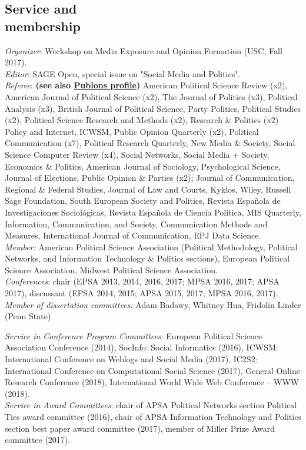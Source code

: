 \documentclass[margin,line,11pt]{resume}
\newcommand{\nl}{\vspace{0.10in}\\}
\begin{document}
\begin{resume}
                \section{\mysidestyle Service and\\membership}
\emph{Organizer}: Workshop on Media Exposure and Opinion Formation (USC, Fall 2017).\nl
\emph{Editor}: SAGE Open, special issue on "Social Media and Politics".\nl
\emph{Referee}: \textbf{(see also \href{https://publons.com/author/1291880/pablo-barbera}{Publons profile})} American Political Science Review (x2), American Journal of Political Science (x2), The Journal of Politics (x3), Political Analysis (x3), British Journal of Political Science, Party Politics, Political Studies (x2), Political Science Research and Methods (x2), Research \& Politics (x2) Policy and Internet, ICWSM, Public Opinion Quarterly (x2), Political Communication (x7), Political Research Quarterly, New Media \& Society, Social Science Computer Review (x4), Social Networks, Social Media + Society, Economics \& Politics, American Journal of Sociology, Psychological Science, Journal of Elections, Public Opinion \& Parties (x2); Journal of Communication, Regional \& Federal Studies, Journal of Law and Courts, Kyklos, Wiley, Russell Sage Foundation, South European Society and Politics, Revista Espa\~{n}ola de Investigaciones Sociol\'{o}gicas, Revista Espa\~{n}ola de Ciencia Pol\'{i}tica, MIS Quarterly, Information, Communication, and Society, Communication Methods and Measures, International Journal of Communication, EPJ Data Science.\nl
\emph{Member:} American Political Science Association (Political Methodology, Political Networks, and Information Technology \& Politics sections), European Political Science Association, Midwest Political Science Association.\nl
\emph{Conferences}: chair (EPSA 2013, 2014, 2016, 2017; MPSA 2016, 2017; APSA 2017), discussant (EPSA 2014, 2015; APSA 2015, 2017; MPSA 2016, 2017).\nl
\emph{Member of dissertation committees:} Adam Badawy, Whitney Hua, Fridolin Linder (Penn State)  

\emph{Service in Conference Program Committees}: European Political Science Association Conference (2014), SocInfo: Social Informatics (2016), ICWSM: International Conference on Weblogs and Social Media (2017), IC2S2: International Conference on Computational Social Science (2017), General Online Research Conference (2018),  International World Wide Web Conference
-- WWW (2018).\nl
\emph{Service in Award Committees}: chair of APSA Political Networks section Political Ties award committee (2016), chair of APSA Information Technology and Politics section best paper award committee (2017), member of Miller Prize Award committee (2017).



\end{resume}
\end{document}
